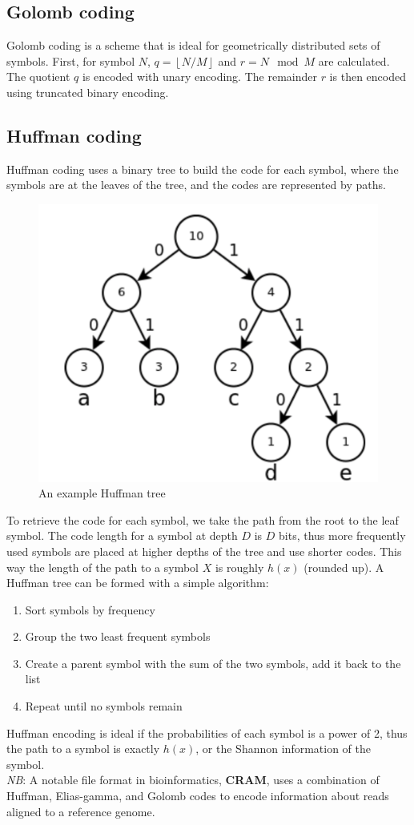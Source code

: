 \documentclass[12pt]{article}
\begin{document}
\subsection{Golomb coding}
Golomb coding is a scheme that is ideal for geometrically distributed sets of symbols. First, for symbol $N$, $q = \left \lfloor{N / M}\right \rfloor $ and $r = N \mod M$ are calculated. The quotient $q$ is encoded with unary encoding. The remainder $r$ is then encoded using truncated binary encoding.
\subsection{Huffman coding}
Huffman coding uses a binary tree to build the code for each symbol, where the symbols are at the leaves of the tree, and the codes are represented by paths.
\begin{figure}[h]
    \centering
    \includegraphics[width = .5\linewidth]{huffman.png}
    \caption{An example Huffman tree}
    \label{fig:huffman}
\end{figure}
To retrieve the code for each symbol, we take the path from the root to the leaf symbol. The code length for a symbol at depth $D$ is $D$ bits, thus more frequently used symbols are placed at higher depths of the tree and use shorter codes. This way the length of the path to a symbol $X$ is roughly $h(x)$ (rounded up). A Huffman tree can be formed with a simple algorithm:
\begin{enumerate}
    \item Sort symbols by frequency
    \item Group the two least frequent symbols 
    \item Create a parent symbol with the sum of the two symbols, add it back to the list
    \item Repeat until no symbols remain
\end{enumerate}
Huffman encoding is ideal if the probabilities of each symbol is a power of 2, thus the path to a symbol is exactly $h(x)$, or the Shannon information of the symbol.\\[10pt]
\textit{NB}: A notable file format in bioinformatics, \textbf{CRAM}, uses a combination of Huffman, Elias-gamma, and Golomb codes to encode information about reads aligned to a reference genome.
\end{document}
